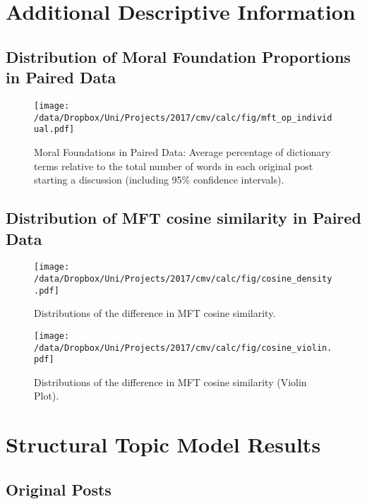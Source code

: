 
\section{Additional Descriptive Information}
\renewcommand\thefigure{A.\arabic{figure}}
\renewcommand\thetable{A.\arabic{table}}
\setcounter{figure}{0}
\setcounter{table}{0}


\subsection{Distribution of Moral Foundation Proportions in Paired Data}

\begin{figure}[h]
\centering
\texttt{[image: /data/Dropbox/Uni/Projects/2017/cmv/calc/fig/mft\_op\_individual.pdf]}
\caption[Moral Foundations in Paired Data]{Moral Foundations in Paired Data: Average percentage of dictionary terms relative to the total number of words in each original post starting a discussion (including 95\% confidence intervals).}
\end{figure}


\clearpage
\subsection{Distribution of MFT cosine similarity in Paired Data}

\begin{figure}[h]
\centering
\texttt{[image: /data/Dropbox/Uni/Projects/2017/cmv/calc/fig/cosine\_density.pdf]}
\caption{Distributions of the difference in MFT cosine similarity.}
\end{figure}


\begin{figure}[h]
\centering
\texttt{[image: /data/Dropbox/Uni/Projects/2017/cmv/calc/fig/cosine\_violin.pdf]}
\caption{Distributions of the difference in MFT cosine similarity (Violin Plot).}
\end{figure}

\clearpage
\section{Structural Topic Model Results}
\renewcommand\thefigure{B.\arabic{figure}}
\renewcommand\thetable{B.\arabic{table}}
\setcounter{figure}{0}
\setcounter{table}{0}

\subsection{Original Posts}


